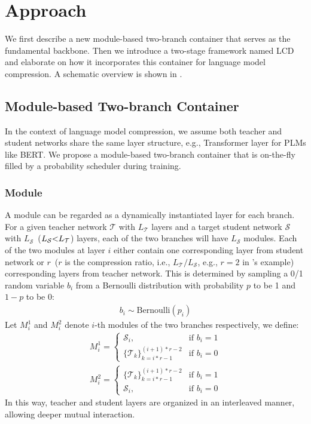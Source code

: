 \section{Approach}

We first describe a new module-based two-branch container that serves as the fundamental backbone. Then we 
introduce a two-stage framework named LCD and elaborate on how it incorporates this container for language model compression. A schematic overview is shown in .
\subsection{Module-based Two-branch Container} 
\label{sec:branch}
In the context of language model compression, we assume both teacher and student networks share the same layer structure, e.g., Transformer layer for PLMs like BERT. We propose a module-based two-branch container that is on-the-fly filled by a probability scheduler during training. 



\subsubsection{Module}
A module can be regarded as a dynamically instantiated layer for each branch. For a given teacher network $\mathcal{T}$ with $L_{\mathcal{T}}$ layers and a target student network $\mathcal{S}$ with $L_{\mathcal{S}}$~($L_{\mathcal{S}}\small{<}L_{\mathcal{T}}$) layers, each of the two branches will have $L_{\mathcal{S}}$ modules. Each of the two modules at layer $i$  either contain one corresponding layer from student network or $r$~($r$ is the compression ratio, i.e.,
$L_{\mathcal{T}}/L_{\mathcal{S}}$, e.g., $r=2$ in 's example) corresponding layers from 
teacher network. This is determined by sampling a 0/1 random variable $b_i$ from a Bernoulli distribution with probability $p$ to be 1 and $1-p$ to be 0:
\begin{align}
    \nonumber
    b_i \sim \text{Bernoulli}(p_i) 
\end{align}
Let $M_{i}^1$ and $M_{i}^2$ denote $i$-th modules of the two branches respectively, we define:
\begin{align}
    \nonumber
    M_{i}^1=
    \begin{cases} 
        \mathcal{S}_i,  & \text{if }b_i=1 \\
        \{\mathcal{T}_k\}_{k=i*r-1}^{(i+1)*r-2} & \text{if }b_i=0
    \end{cases} \\
    \nonumber
    M_{i}^2=
    \begin{cases} 
        \{\mathcal{T}_k\}_{k=i*r-1}^{(i+1)*r-2} & \text{if }b_i=1 \\
        \mathcal{S}_i,  & \text{if }b_i=0 
    \end{cases}
\end{align}
In this way, teacher and student layers are organized in an interleaved manner, allowing deeper mutual interaction. 

